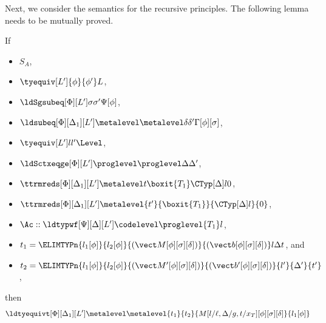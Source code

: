 Next, we consider the semantics for the recursive principles. %
The following lemma needs to be mutually proved.
\begin{lemma}
  If
  \begin{itemize}
  \item $S_A$,
  \item $\tyequiv[L']{\phi}{\phi'}L$,
  \item $\ldSgsubeq[\Phi][L'] \sigma{\sigma'}{\Psi[\phi]}$,
  \item $\ldsubeq[\Phi][\Delta_1][L'] \metalevel \metalevel \delta{\delta'}{\Gamma[\phi][\sigma]}$,
  \item $\tyequiv[L']l{l'}\Level$,
  \item $\ldSctxeqge[\Phi][L']\proglevel \proglevel\Delta{\Delta'}$,
  \item $\ttrmreds[\Phi][\Delta_1][L'] \metalevel t{\boxit{T_1}} {\CTyp[\Delta] l}{0}$,
  \item $\ttrmreds[\Phi][\Delta_1][L'] \metalevel{t'}{\boxit{T_1}}{\CTyp[\Delta] l}{0}$,
  \item $\Ac :: \ldtypwf[\Psi][\Delta][L'] \codelevel \proglevel {T_1}l$, 
  \item
    $t_1 = \ELIMTYPn{l_1[\phi]}{l_2[\phi]}{(\vect M[\phi][\sigma][\delta])}{(\vect
      b[\phi][\sigma][\delta])}l \Delta t$, and
  \item
    $t_2 = \ELIMTYPn{l_1[\phi]}{l_2[\phi]}{(\vect M'[\phi][\sigma][\delta])}{(\vect
      b'[\phi][\sigma][\delta])}{l'}{\Delta'}{t'}$,
  \end{itemize}
  then
  \[
    \ldtyequivt[\Phi][\Delta_1][L'] \metalevel \metalevel{t_1}{t_2}{M[l/\ell,\Delta/g,t/x_T][\phi][\sigma][\delta]}{l_1[\phi]}
  \]
\end{lemma}
